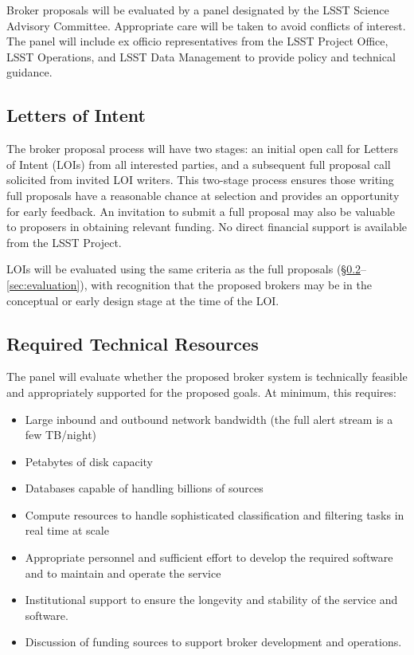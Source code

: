 Broker proposals will be evaluated by a panel designated by the LSST Science Advisory Committee.  Appropriate care will be taken to avoid conflicts of interest.
The panel will include ex officio representatives from the LSST Project Office, LSST Operations, and LSST Data Management to provide policy and technical guidance.

\subsection{Letters of Intent} \label{sec:LOIs}

The broker proposal process will have two stages:  
an initial open call for Letters of Intent (LOIs) from all interested parties, and a subsequent full proposal call solicited from invited LOI writers.
This two-stage process ensures those writing full proposals have a reasonable chance at selection and provides an opportunity for early feedback.
An invitation to submit a full proposal may also be valuable to proposers in obtaining relevant funding.
No direct financial support is available from the LSST Project.

LOIs will be evaluated using the same criteria as the full proposals (\S \ref{sec:resources}--\ref{sec:evaluation}), with recognition that the proposed brokers may be in the conceptual or early design stage at the time of the LOI.


\subsection{Required Technical Resources} \label{sec:resources}

The panel will evaluate whether the proposed broker system is technically feasible and appropriately supported for the proposed goals.  
At minimum, this requires:

\begin{itemize}
	\item Large inbound and outbound network bandwidth (the full alert stream is a few TB/night)
	\item Petabytes of disk capacity
	\item Databases capable of handling billions of sources
	\item Compute resources to handle sophisticated classification and filtering tasks in real time at scale
	\item Appropriate personnel and sufficient effort to develop the required software and to maintain and operate the service
	\item Institutional support to ensure the longevity and stability of the service and software.
	\item Discussion of funding sources to support broker development and operations.
\end{itemize}

